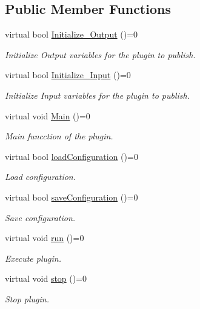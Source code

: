\subsection*{Public Member Functions}
\begin{DoxyCompactItemize}
\item 
virtual bool \hyperlink{class_i_plugin_a0b772513fc8c4ed01240e19c4bb84068}{Initialize\+\_\+\+Output} ()=0
\begin{DoxyCompactList}\small\item\em Initialize Output variables for the plugin to publish. \end{DoxyCompactList}\item 
virtual bool \hyperlink{class_i_plugin_aa7c66743ad956d8ada57becee559af4d}{Initialize\+\_\+\+Input} ()=0
\begin{DoxyCompactList}\small\item\em Initialize Input variables for the plugin to publish. \end{DoxyCompactList}\item 
virtual void \hyperlink{class_i_plugin_ab5fdb3b0f7afdcee04324dca01766749}{Main} ()=0
\begin{DoxyCompactList}\small\item\em Main funcction of the plugin. \end{DoxyCompactList}\item 
virtual bool \hyperlink{class_i_plugin_a418cff309436d3a15d9a4ce7369db6dd}{load\+Configuration} ()=0
\begin{DoxyCompactList}\small\item\em Load configuration. \end{DoxyCompactList}\item 
virtual bool \hyperlink{class_i_plugin_a79b5c42b1c7b08257a6110b2091039bc}{save\+Configuration} ()=0
\begin{DoxyCompactList}\small\item\em Save configuration. \end{DoxyCompactList}\item 
virtual void \hyperlink{class_i_plugin_a46b4ace767e77f9db9c9585e99c09039}{run} ()=0
\begin{DoxyCompactList}\small\item\em Execute plugin. \end{DoxyCompactList}\item 
virtual void \hyperlink{class_i_plugin_a86e523c283aec5c9fb21249a76e916ac}{stop} ()=0
\begin{DoxyCompactList}\small\item\em Stop plugin. \end{DoxyCompactList}\end{DoxyCompactItemize}

